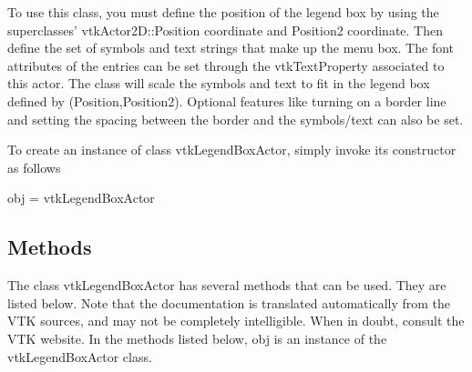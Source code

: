 To use this class, you must define the position of the legend box by using the superclasses' vtk\-Actor2\-D\-::\-Position coordinate and Position2 coordinate. Then define the set of symbols and text strings that make up the menu box. The font attributes of the entries can be set through the vtk\-Text\-Property associated to this actor. The class will scale the symbols and text to fit in the legend box defined by (Position,Position2). Optional features like turning on a border line and setting the spacing between the border and the symbols/text can also be set.

To create an instance of class vtk\-Legend\-Box\-Actor, simply invoke its constructor as follows \begin{DoxyVerb}  obj = vtkLegendBoxActor
\end{DoxyVerb}
 \hypertarget{vtkwidgets_vtkxyplotwidget_Methods}{}\subsection{Methods}\label{vtkwidgets_vtkxyplotwidget_Methods}
The class vtk\-Legend\-Box\-Actor has several methods that can be used. They are listed below. Note that the documentation is translated automatically from the V\-T\-K sources, and may not be completely intelligible. When in doubt, consult the V\-T\-K website. In the methods listed below, {\ttfamily obj} is an instance of the vtk\-Legend\-Box\-Actor class. 
